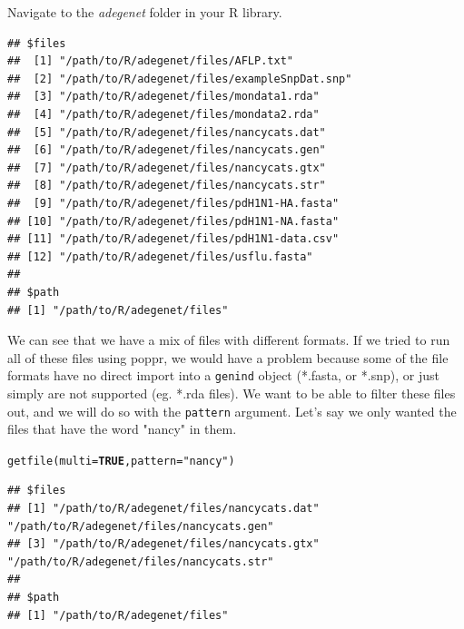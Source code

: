 \documentclass[letterpaper]{article}\usepackage[]{graphicx}\usepackage[]{color}
\makeatletter
\newcommand{\hlnum}[1]{\textcolor[rgb]{0.502,0,0.502}{\textbf{#1}}}%
\newcommand{\hlstr}[1]{\textcolor[rgb]{0.651,0.522,0}{#1}}%
\newcommand{\hlstd}[1]{\textcolor[rgb]{0,0,0}{#1}}%
\newcommand{\hlkwc}[1]{\textcolor[rgb]{0,0.502,0.753}{#1}}%
\newcommand{\hlkwd}[1]{\textcolor[rgb]{0,0.267,0.4}{#1}}%
\newenvironment{kframe}{%
 \def\at@end@of@kframe{}%
 \ifinner\ifhmode%
  \def\at@end@of@kframe{\end{minipage}}%
  \begin{minipage}{\columnwidth}%
 \fi\fi%
 \def\FrameCommand##1{\hskip\@totalleftmargin \hskip-\fboxsep
 \colorbox{shadecolor}{##1}\hskip-\fboxsep
     \hskip-\linewidth \hskip-\@totalleftmargin \hskip\columnwidth}%
 \MakeFramed {\advance\hsize-\width
   \@totalleftmargin\z@ \linewidth\hsize
   \@setminipage}}%
 {\par\unskip\endMakeFramed%
 \at@end@of@kframe}
\newenvironment{knitrout}{}{} %
\makeatother
\begin{document}
Navigate to the \textit{adegenet} folder in your R library.
\begin{knitrout}\footnotesize
{}\color{fgcolor}\begin{kframe}
\begin{verbatim}
## $files
##  [1] "/path/to/R/adegenet/files/AFLP.txt"         
##  [2] "/path/to/R/adegenet/files/exampleSnpDat.snp"
##  [3] "/path/to/R/adegenet/files/mondata1.rda"     
##  [4] "/path/to/R/adegenet/files/mondata2.rda"     
##  [5] "/path/to/R/adegenet/files/nancycats.dat"    
##  [6] "/path/to/R/adegenet/files/nancycats.gen"    
##  [7] "/path/to/R/adegenet/files/nancycats.gtx"    
##  [8] "/path/to/R/adegenet/files/nancycats.str"    
##  [9] "/path/to/R/adegenet/files/pdH1N1-HA.fasta"  
## [10] "/path/to/R/adegenet/files/pdH1N1-NA.fasta"  
## [11] "/path/to/R/adegenet/files/pdH1N1-data.csv"  
## [12] "/path/to/R/adegenet/files/usflu.fasta"      
## 
## $path
## [1] "/path/to/R/adegenet/files"
\end{verbatim}
\end{kframe}
\end{knitrout}


We can see that we have a mix of files with different formats. If we tried to run all of these files using poppr, we would have a problem because some of the file formats have no direct import into a \texttt{genind} object (*.fasta, or *.snp), or just simply are not supported (eg. *.rda files). We want to be able to filter these files out, and we will do so with the \texttt{pattern} argument. Let's say we only wanted the files that have the word "nancy" in them.
\begin{knitrout}\footnotesize
{}\color{fgcolor}\begin{kframe}
\begin{alltt}
\hlkwd{getfile}\hlstd{(}\hlkwc{multi} \hlstd{=} \hlnum{TRUE}\hlstd{,} \hlkwc{pattern} \hlstd{=} \hlstr{"nancy"}\hlstd{)}
\end{alltt}
\end{kframe}
\end{knitrout}

\begin{knitrout}\footnotesize
{}\color{fgcolor}\begin{kframe}
\begin{verbatim}
## $files
## [1] "/path/to/R/adegenet/files/nancycats.dat" "/path/to/R/adegenet/files/nancycats.gen"
## [3] "/path/to/R/adegenet/files/nancycats.gtx" "/path/to/R/adegenet/files/nancycats.str"
## 
## $path
## [1] "/path/to/R/adegenet/files"
\end{verbatim}
\end{kframe}
\end{knitrout}
\end{document}

